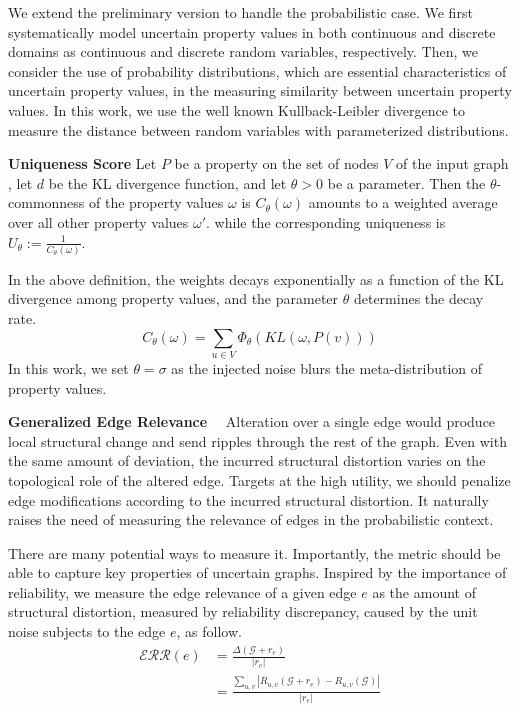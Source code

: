 We extend the preliminary version to handle the probabilistic case. 
We first systematically model uncertain property values in both continuous and discrete domains as continuous and discrete random variables, respectively.
Then, we consider the use of probability distributions, which are essential characteristics of uncertain property values, in the measuring similarity between uncertain property values. 
In this work, we use the well known Kullback-Leibler divergence to measure the distance between random variables with parameterized distributions. 

\begin{definition}
    \textbf{Uniqueness Score}
    Let $P$ be a property on the set of nodes $V$ of the input graph ,  
    let $d$ be the KL divergence function, 
    and let $\theta >0$  be a parameter. 
    Then the $\theta$-commonness of the property values $\omega$
    is $C_{\theta}(\omega)$ amounts to a weighted average over all other property values $\omega'$.    
     while the corresponding uniqueness is $U_{\theta}:= \frac{1}{C_{\theta}(\omega)}$. 
    \vspace{-5pt}
\end{definition} 
In the above definition, the weights decays exponentially as a function of the KL divergence among property values, 
and the parameter $\theta$ determines the decay rate. 
\begin{equation*}
  C_{\theta}(\omega) = \sum_{u \in V} \Phi_{\theta}(KL(\omega, P(v)))
\end{equation*}
In this work, we set $\theta=\sigma$ as the injected noise blurs the meta-distribution of property values. 
 
\textbf{Generalized Edge Relevance}~~
Alteration over a single edge would produce local structural change and send ripples through the rest of the graph. 
Even with the same amount of deviation, the incurred structural distortion varies on the topological role of the altered edge. 
Targets at the high utility, we should penalize edge modifications according to the incurred structural distortion.  
It naturally raises the need of measuring the relevance of edges in the probabilistic context. 

There are many potential ways to measure it. 
Importantly, the metric should be able to capture key properties of uncertain graphs.
Inspired by the importance of reliability, we measure the edge relevance of a given edge $e$ as the amount of structural distortion, measured by reliability discrepancy, caused by the unit noise subjects to the edge $e$, as follow. 
\begin{equation*}
  \begin{split}
    \mathcal{ERR}({e}) &= \frac{\Delta(\mathcal{G}+r_{e})}{|r_{e}|}  \\
                       &= \frac{\sum_{u,v} |R_{u,v}(\mathcal{G}+r_{e}) -R_{u,v}(\mathcal{G})|} {|r_{e}|}
  \end{split}
\end{equation*}


